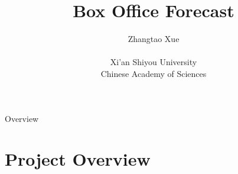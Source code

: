 \documentclass[
 size=14pt,
 paper=smartboard,  %
 mode=present, 		%
 display=slides, 	%
 style=tuliplab,  	%
 pauseslide,
 fleqn,leqno]{powerdot}
\title{Box Office Forecast}
\author{
Zhangtao Xue 
\\
\\Xi'an Shiyou University
\\Chinese Academy of Sciences
}
\begin{document}
\maketitle



\begin{slide}[toc=,bm=]{Overview}
\tableofcontents[content=currentsection,type=1]
\end{slide}


\section{Project Overview}
\end{document}
